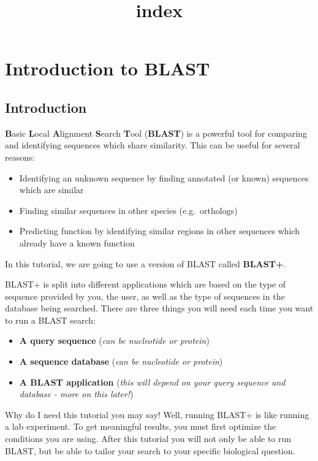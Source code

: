 \documentclass[11pt]{article}
\title{index}
\providecommand{\tightlist}{%
      \setlength{\itemsep}{0pt}\setlength{\parskip}{0pt}}
\begin{document}
    \hypertarget{introduction-to-blast}{%
\section{Introduction to BLAST}\label{introduction-to-blast}}

\hypertarget{introduction}{%
\subsection{Introduction}\label{introduction}}

\textbf{B}asic \textbf{L}ocal \textbf{A}lignment \textbf{S}earch
\textbf{T}ool (\textbf{BLAST}) is a powerful tool for comparing and
identifying sequences which share similarity. This can be useful for
several reasons:

\begin{itemize}
\tightlist
\item
  Identifying an unknown sequence by finding annotated (or known)
  sequences which are similar
\item
  Finding similar sequences in other species (e.g.~orthologs)
\item
  Predicting function by identifying similar regions in other sequences
  which already have a known function
\end{itemize}

In this tutorial, we are going to use a version of BLAST called
\textbf{BLAST+}.

BLAST+ is split into different applications which are based on the type
of sequence provided by you, the user, as well as the type of sequences
in the database being searched. There are three things you will need
each time you want to run a BLAST search:

\begin{itemize}
\tightlist
\item
  \textbf{A query sequence} (\textit{can be nucleotide or protein})\\
\item
  \textbf{A sequence database} (\textit{can be nucleotide or protein})\\
\item
  \textbf{A BLAST application} (\textit{this will depend on your query
  sequence and database - more on this later!})
\end{itemize}

Why do I need this tutorial you may say! Well, running BLAST+ is like
running a lab experiment. To get meaningful results, you must first
optimize the conditions you are using. After this tutorial you will not
only be able to run BLAST, but be able to tailor your search to your
specific biological question.
\end{document}

